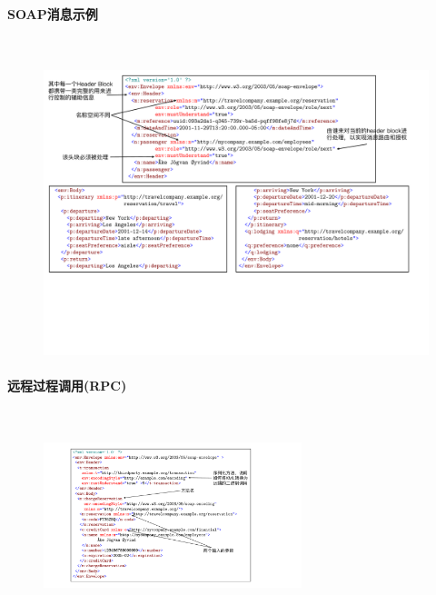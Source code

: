 \paragraph*{SOAP消息示例}~{} \par
\begin{figure}[H]
    \vspace{-0.5em}
	\centering
	\includegraphics[width=\textwidth]{images/SOAP Messages Example.pdf}
    \vspace{-3em}
\end{figure}

\paragraph*{远程过程调用(RPC)}~{} \par
\begin{figure}[H]
    \vspace{-0.5em}
	\centering
	\includegraphics[width=0.67\textwidth]{images/Remote Procedure Calls.pdf}
    \vspace{-2em}
\end{figure}

